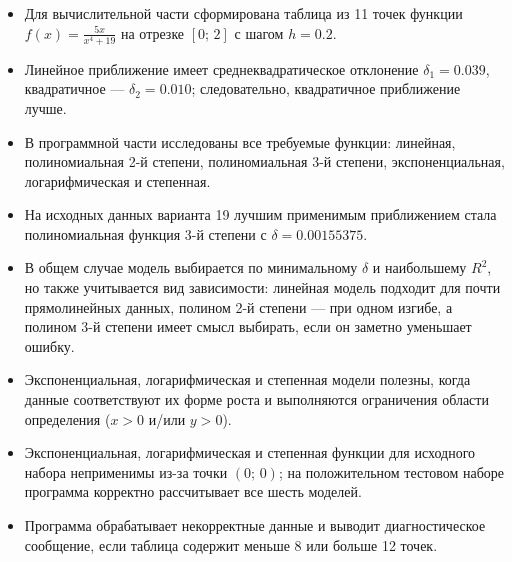\documentclass[12pt,a4paper]{article}
\begin{document}
\begin{itemize}[leftmargin=*]
  \item Для вычислительной части сформирована таблица из 11 точек функции
        $f(x)=\frac{5x}{x^4+19}$ на отрезке $[0;\,2]$ с шагом $h=0.2$.
  \item Линейное приближение имеет среднеквадратическое отклонение
        $\delta_1=0.039$, квадратичное --- $\delta_2=0.010$; следовательно,
        квадратичное приближение лучше.
  \item В программной части исследованы все требуемые функции: линейная,
        полиномиальная 2-й степени, полиномиальная 3-й степени, экспоненциальная,
        логарифмическая и степенная.
  \item На исходных данных варианта 19 лучшим применимым приближением стала
        полиномиальная функция 3-й степени с $\delta=0.00155375$.
  \item В общем случае модель выбирается по минимальному $\delta$ и наибольшему
        $R^2$, но также учитывается вид зависимости: линейная модель подходит для
        почти прямолинейных данных, полином 2-й степени --- при одном изгибе, а
        полином 3-й степени имеет смысл выбирать, если он заметно уменьшает ошибку.
  \item Экспоненциальная, логарифмическая и степенная модели полезны, когда данные
        соответствуют их форме роста и выполняются ограничения области определения
        ($x>0$ и/или $y>0$).
  \item Экспоненциальная, логарифмическая и степенная функции для исходного набора
        неприменимы из-за точки $(0;\,0)$; на положительном тестовом наборе программа
        корректно рассчитывает все шесть моделей.
  \item Программа обрабатывает некорректные данные и выводит диагностическое сообщение,
        если таблица содержит меньше 8 или больше 12 точек.
\end{itemize}
\end{document}
